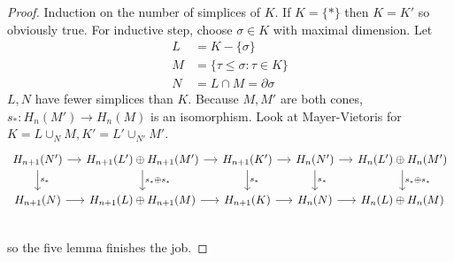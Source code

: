 \documentclass[a4paper]{article}
\renewcommand{\b}{\partial} %
\begin{document}
\begin{proof}
  Induction on the number of simplices of \(K\). If \(K = \{*\}\) then \(K = K'\) so obviously true. For inductive step, choose \(\sigma \in K\) with maximal dimension. Let
  \begin{align*}
    L &= K - \{\sigma\} \\
    M &= \{\tau \leq \sigma: \tau \in K\} \\
    N &= L \cap M = \b \sigma
  \end{align*}
  \(L, N\) have fewer simplices than \(K\). Because \(M, M'\) are both cones, \(s_*: H_n(M') \to H_n(M)\) is an isomorphism. Look at Mayer-Vietoris for \(K = L \cup_N M, K' = L' \cup_{N'} M'\).
  \[
    \begin{tikzcd}[column sep=small]
      H_{n + 1}(N') \ar[r] \ar[d, "s_*"] & H_{n + 1}(L') \oplus H_{n + 1}(M') \ar[r] \ar[d, "s_* \oplus s_*"] & H_{n + 1}(K') \ar[r] \ar[d, "s_*"] & H_n(N') \ar[r] \ar[d, "s_*"] & H_n(L') \oplus H_n(M') \ar[d, "s_* \oplus s_*"] \\
      H_{n + 1}(N) \ar[r] & H_{n + 1}(L) \oplus H_{n + 1}(M) \ar[r] & H_{n + 1}(K) \ar[r] & H_n(N) \ar[r] & H_n(L) \oplus H_n(M) \\
    \end{tikzcd}
  \]
  so the five lemma finishes the job.
\end{proof}











\printindex
\end{document}

